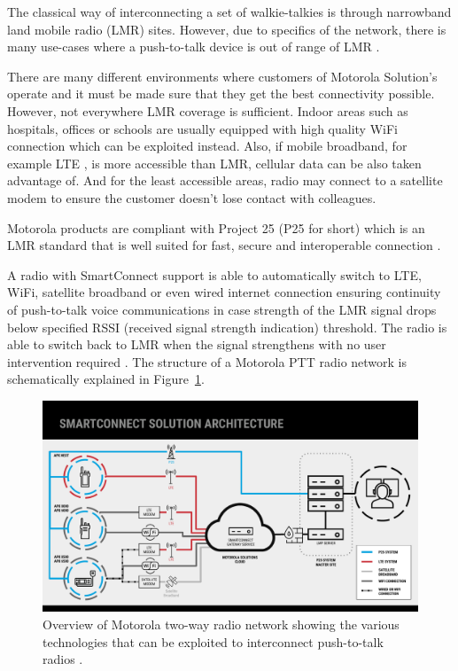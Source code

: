 The classical way of interconnecting a set of walkie-talkies is through narrowband land mobile radio (LMR) sites.
However, due to specifics of the network, there is many use-cases where a push-to-talk device is out of range of LMR \cite{apxnextslides}. 

There are many different environments where customers of Motorola Solution's operate and it must be made sure that they get the best connectivity possible. 
However, not everywhere LMR coverage is sufficient. 
Indoor areas such as hospitals, offices or schools are usually equipped with high quality WiFi connection which can be exploited instead.
Also, if mobile broadband, for example LTE \cite{dahlman20134g}, is more accessible than LMR, cellular data can be also taken advantage of. And for the least accessible areas, radio may connect to a satellite modem to ensure the customer doesn't lose contact with colleagues.

Motorola products are compliant with Project 25 (P25 for short) which is an LMR standard that is well suited for fast, secure and interoperable connection \cite{project25}.

A radio with SmartConnect support is able to automatically switch to LTE, WiFi, satellite broadband or even wired internet connection ensuring continuity of push-to-talk voice communications in case strength of the LMR signal drops below specified RSSI (received signal strength indication) threshold. 
The radio is able to switch back to LMR when the signal strengthens with no user intervention required \cite{apxnextfactsheet} \cite{businesswireapxnext}.
The structure of a Motorola PTT radio network is schematically explained in Figure~\ref{smart-connect:smart-connect-architecture}.

\begin{figure}[h]
    \centering
    \includegraphics[width=\textwidth]{img/motorola-smart-connect-architecture.pdf}
    \caption{Overview of Motorola two-way radio network showing the various technologies that can be exploited to interconnect push-to-talk radios \cite{apxnextslides}.}
    \label{smart-connect:smart-connect-architecture}
\end{figure}


